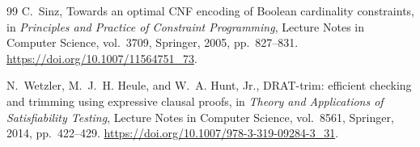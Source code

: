 \documentclass[11pt]{article}
\numberwithin{equation}{section}
\theoremstyle{definition}
\theoremstyle{remark}
\begin{document}
\begin{thebibliography}{99}
C.~Sinz,
\newblock Towards an optimal CNF encoding of Boolean cardinality constraints,
\newblock in \emph{Principles and Practice of Constraint Programming}, Lecture
  Notes in Computer Science, vol.~3709, Springer, 2005, pp.~827--831.
\newblock \url{https://doi.org/10.1007/11564751_73}.

N.~Wetzler, M.~J.~H. Heule, and W.~A. Hunt, Jr.,
\newblock DRAT-trim: efficient checking and trimming using expressive clausal
  proofs,
\newblock in \emph{Theory and Applications of Satisfiability Testing}, Lecture
  Notes in Computer Science, vol.~8561, Springer, 2014, pp.~422--429.
\newblock \url{https://doi.org/10.1007/978-3-319-09284-3_31}.

\end{thebibliography}
\end{document}
